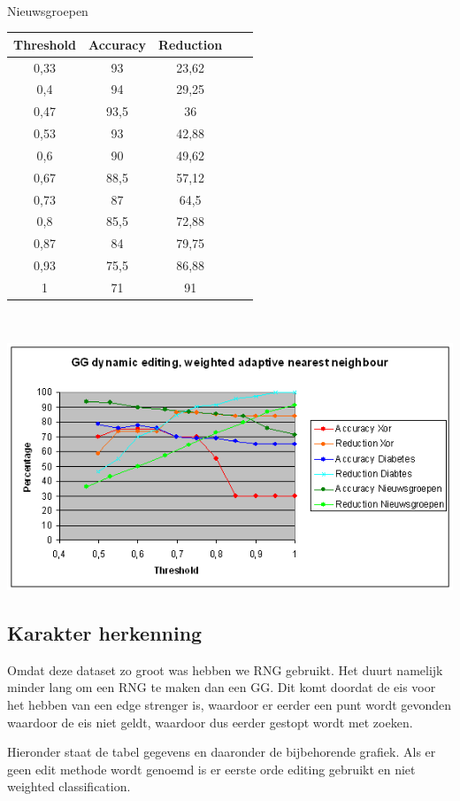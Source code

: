 \documentclass{article}
\begin{document}
\\
Nieuwsgroepen\\
\begin{tabular}{|c|c|c|c|c|}  \hline
Threshold	& Accuracy &	Reduction \\ \hline
0,33 &	93 &	23,62 \\
0,4 &	94 &	29,25 \\
0,47 &	93,5 &	36 \\
0,53 &	93 &	42,88 \\
0,6 &	90 &	49,62 \\
0,67 &	88,5 &	57,12 \\
0,73 &	87 &	64,5 \\
0,8 &	85,5 &	72,88 \\
0,87 &	84 &	79,75 \\
0,93 &	75,5 &	86,88 \\
1 &	71 &	91 \\ \hline
\end{tabular} \\

\begin{center} \includegraphics[scale=0.7]{GG_dynamic_adaptive} \end{center}

\subsection{Karakter herkenning}
Omdat deze dataset zo groot was hebben we RNG gebruikt. Het duurt namelijk minder lang om een RNG te maken dan een GG. Dit komt doordat de eis voor het hebben van een edge strenger is, waardoor er eerder een punt wordt gevonden waardoor de eis niet geldt, waardoor dus eerder gestopt wordt met zoeken.

Hieronder staat de tabel gegevens en daaronder de bijbehorende grafiek. Als er geen edit methode wordt genoemd is er eerste orde editing gebruikt en niet weighted classification.
\end{document}
